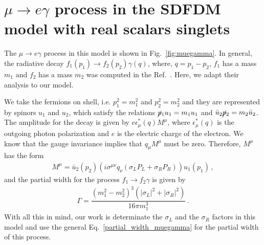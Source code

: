\section{$\mu  \rightarrow e \gamma$ process in the SDFDM model with real scalars singlets}
\label{sec:Ap-muegamma}

The $\mu  \rightarrow e \gamma$ process in this model is shown in Fig.~\ref{fig:muegamma}.
In general, the radiative decay $f_1(p_1)  \rightarrow f_2(p_2) \gamma (q)$, where, $q=p_1-p_2$, $f_1$ has a mass $m_1$ and $f_2 $ has a mass $m_2$ was computed in the Ref.~\cite{Lavoura:2003xp}. Here, we adapt their analysis to our model.

We take the fermions on shell, i.e. $p_1^2=m_1^2$  and $p_2^2=m_2^2$ and they are represented by spinors $u_1$ and $u_2$, which satisfy the relations $\cancel{p}_1u_1=m_1u_1$ and $\bar{u}_2\cancel{p}_2=m_2\bar{u}_2$.
%
The amplitude for the decay is given by $e \epsilon^*_{\mu}(q)M^{\mu}$, where $\epsilon^*_{\mu}(q)$ is the outgoing photon polarization and $e$ is the electric charge of the electron. We know that the gauge invariance implies that $q_{\mu}M^{\mu}$ must be zero. 
Therefore, $M^{\mu}$ has the form
%
\begin{align}
M^{\mu}=\bar{u}_2(p_2)( i\sigma^{\mu\nu}q_{\nu}(\sigma_LP_L+\sigma_RP_R))u_1(p_1)\,,
\end{align}
%
and the partial width for the process $f_1\rightarrow f_2\gamma$ is given by
%
\begin{align}
\Gamma = \dfrac{(m_1^2-m_2^2)^3(|\sigma_L|^2+|\sigma_R|^2)}{16\pi m_1^3}\,.
\label{partial_width_muegamma}
\end{align}
%
With all this in mind, our work is determinate the $\sigma_L$ and the $\sigma_R$ factors in this model and use the general Eq.~\eqref{partial_width_muegamma} for the partial width of this process.

